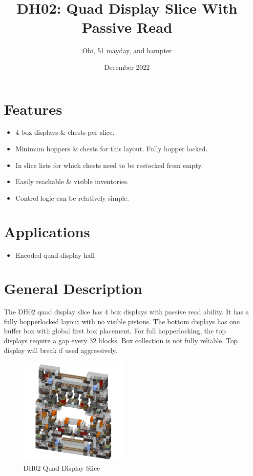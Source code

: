 \documentclass[10pt]{datasheet}
\title{DH02: Quad Display Slice With Passive Read}
\author{Obi, 51 mayday, and hampter}
\date{December 2022}
\begin{document}
\maketitle

\section{Features}

\begin{itemize}
\item{4 box displays \& chests per slice.}
\item{Minimum hoppers \& chests for this layout. Fully hopper locked.}
\item{In slice lists for which chests need to be restocked from empty.}
\item{Easily reachable \& visible inventories.}
\item{Control logic can be relatively simple.}
\end{itemize}

\section{Applications}

\begin{itemize}
\item{Encoded quad-display hall}
\end{itemize}

\section{General Description}
The DH02 quad display slice has 4 box displays with passive read ability. It has a fully hopperlocked layout with no visible pistons. The bottom displays has one buffer box with global first box placement. For full hopperlocking, the top displays require a gap every 32 blocks. Box collection is not fully reliable. Top display will break if used aggressively.
\vfill\break

\begin{figure}[h]
    \centering
    \includegraphics[width=0.48\textwidth]{slice.png}
    \caption{\centering DH02 Quad Display Slice}
\end{figure}
\end{document}
